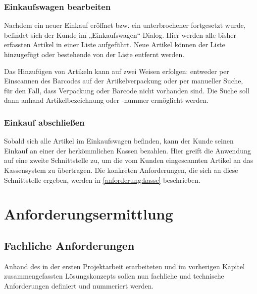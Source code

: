 \subsubsection*{Einkaufswagen bearbeiten}
Nachdem ein neuer Einkauf eröffnet bzw. ein unterbrochener fortgesetzt wurde, befindet sich der Kunde im „Einkaufswagen“-Dialog. Hier werden alle bisher erfassten Artikel in einer Liste aufgeführt. Neue Artikel können der Liste hinzugefügt oder bestehende von der Liste entfernt werden.

Das Hinzufügen von Artikeln kann auf zwei Weisen erfolgen: entweder per Einscannen des Barcodes auf der Artikelverpackung oder per manueller Suche, für den Fall, dass Verpackung oder Barcode nicht vorhanden sind. Die Suche soll dann anhand Artikelbezeichnung oder -nummer ermöglicht werden.

\subsubsection*{Einkauf abschließen}
Sobald sich alle Artikel im Einkaufswagen befinden, kann der Kunde seinen Einkauf an einer der herkömmlichen Kassen bezahlen. Hier greift die Anwendung auf eine zweite Schnittstelle zu, um die vom Kunden eingescannten Artikel an das Kassensystem zu übertragen. Die konkreten Anforderungen, die sich an diese Schnittstelle ergeben, werden in \vref{anforderung:kasse} beschrieben.

\section{Anforderungsermittlung}\label{anforderungen}

\subsection{Fachliche Anforderungen}
Anhand des in der ersten Projektarbeit erarbeiteten und im vorherigen Kapitel zusammengefassten Lösungskonzepts sollen nun fachliche und technische Anforderungen definiert und nummeriert werden.

